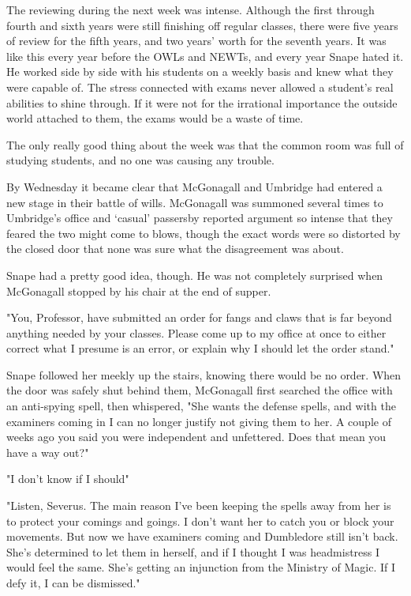 \sbreak

The reviewing during the next week was intense. Although the first through fourth and sixth years were still finishing off regular classes, there were five years of review for the fifth years, and two years' worth for the seventh years. It was like this every year before the OWLs and NEWTs, and every year Snape hated it. He worked side by side with his students on a weekly basis and knew what they were capable of. The stress connected with exams never allowed a student's real abilities to shine through. If it were not for the irrational importance the outside world attached to them, the exams would be a waste of time.

The only really good thing about the week was that the common room was full of studying students, and no one was causing any trouble.

By Wednesday it became clear that McGonagall and Umbridge had entered a new stage in their battle of wills. McGonagall was summoned several times to Umbridge's office and `casual' passersby reported argument so intense that they feared the two might come to blows, though the exact words were so distorted by the closed door that none was sure what the disagreement was about.

Snape had a pretty good idea, though. He was not completely surprised when McGonagall stopped by his chair at the end of supper.

"You, Professor, have submitted an order for fangs and claws that is far beyond anything needed by your classes. Please come up to my office at once to either correct what I presume is an error, or explain why I should let the order stand."

Snape followed her meekly up the stairs, knowing there would be no order. When the door was safely shut behind them, McGonagall first searched the office with an anti-spying spell, then whispered, "She wants the defense spells, and with the examiners coming in I can no longer justify not giving them to her. A couple of weeks ago you said you were independent and unfettered. Does that mean you have a way out?"

"I don't know if I should{\el}"

"Listen, Severus. The main reason I've been keeping the spells away from her is to protect your comings and goings. I don't want her to catch you or block your movements. But now we have examiners coming and Dumbledore still isn't back. She's determined to let them in herself, and if I thought I was headmistress I would feel the same. She's getting an injunction from the Ministry of Magic. If I defy it, I can be dismissed."

